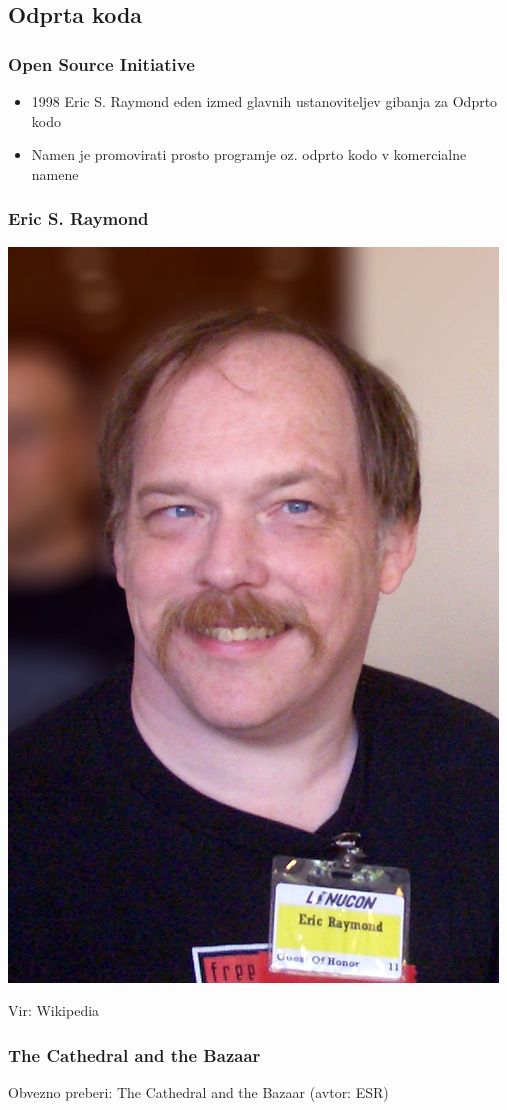 \documentclass{beamer}
\newcommand{\vir}[1]{\tiny{Vir: #1}}
\begin{document}
\subsection{Odprta koda}
\begin{frame}
\frametitle{Open Source Initiative}

\begin{itemize}
\item 1998 Eric S. Raymond eden izmed glavnih ustanoviteljev gibanja za Odprto kodo
\item Namen je promovirati prosto programje oz. odprto kodo v komercialne namene
\end{itemize}
\end{frame}

\begin{frame}
\frametitle{Eric S. Raymond}
\begin{center}
\includegraphics[width=0.35\linewidth]{slike/ESR.jpg}
\end{center}
\vir{Wikipedia}
\end{frame}

\begin{frame}
\frametitle{The Cathedral and the Bazaar}
\begin{center}
Obvezno preberi: The Cathedral and the Bazaar (avtor: ESR)
\end{center}
\end{frame}
\end{document}
